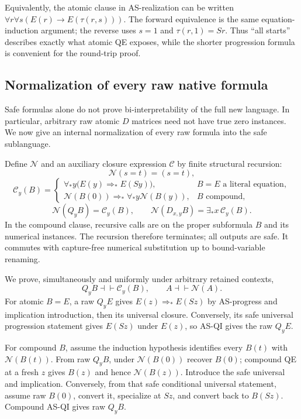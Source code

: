 Equivalently, the atomic clause in AS-realization can be written
$\forall r\forall s(E(r)\to E(\tau(r,s)))$. The forward equivalence
is the same equation-induction argument; the reverse uses $s=1$ and
$\tau(r,1)=Sr$. Thus ``all starts'' describes exactly what atomic QE
exposes, while the shorter progression formula is convenient for the
round-trip proof.

\subsection{Normalization of every raw native formula}

Safe formulas alone do not prove bi-interpretability of the full new
language. In particular, arbitrary raw atomic $D$ matrices need not
have true zero instances. We now give an internal normalization of
every raw formula into the safe sublanguage.

Define $\mathcal N$ and an auxiliary closure expression $\mathcal C$
by finite structural recursion:
\[
 \mathcal N(s=t)=(s=t),
\]
\[
 \mathcal C_y(B)=
 \begin{cases}
  \forall_*y\bigl(E(y)\Rightarrow_*E(Sy)\bigr),&B=E
       \text{ a literal equation},\\
  \mathcal N(B(0))\Rightarrow_*
       \forall_*y\mathcal N(B(y)),&B\text{ compound},
 \end{cases}
\]
\[
 \mathcal N(Q_yB)=\mathcal C_y(B),\qquad
 \mathcal N(D_{x,y}B)=\exists_*x\,\mathcal C_y(B).
 \tag{AS-normalization}
\]
In the compound clause, recursive calls are on the proper subformula
$B$ and its numerical instances. The recursion therefore terminates;
all outputs are safe. It commutes with capture-free numerical
substitution up to bound-variable renaming.

We prove, simultaneously and uniformly under arbitrary retained
contexts,
\[
 Q_yB\dashv\vdash\mathcal C_y(B),\qquad
 A\dashv\vdash\mathcal N(A).
 \tag{AS-roundtrip}
\]
For atomic $B=E$, a raw $Q_yE$ gives $E(z)\Rightarrow_*E(Sz)$
by AS-progress and implication introduction, then its universal
closure. Conversely, its safe universal progression statement gives
$E(Sz)$ under $E(z)$, so AS-QI gives the raw $Q_yE$.

For compound $B$, assume the induction hypothesis identifies every
$B(t)$ with $\mathcal N(B(t))$. From raw $Q_yB$, under
$\mathcal N(B(0))$ recover $B(0)$; compound QE at a fresh $z$
gives $B(z)$ and hence $\mathcal N(B(z))$. Introduce the safe
universal and implication. Conversely, from that safe conditional
universal statement, assume raw $B(0)$, convert it, specialize at
$Sz$, and convert back to $B(Sz)$. Compound AS-QI gives raw $Q_yB$.


